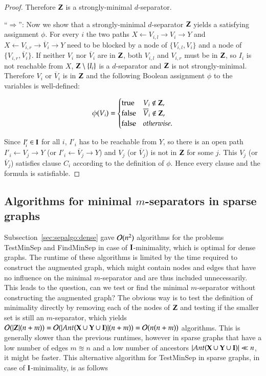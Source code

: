 \begin{proof}
Therefore $ {\bf Z} $ is a strongly-minimal $ d $-separator.

“$\Rightarrow$”: Now we show that a strongly-minimal $ d $-separator $ {\bf Z} $ yields a satisfying assignment $ \phi $. For every $i$ the two paths $X \gets V_{i,l} \to V_i \to Y $ and $X \gets V_{i,r} \to \overline{V}_i \to Y $ need to be blocked by a node of $ \{V_{i,l}, V_i\} $ and a node of $ \{V_{i,r}, \overline{V}_i\} $. If neither $V_i$ nor $ \overline{V}_i $ are in $ {\bf Z} $, 
both $V_{i,l}$ and $V_{i,r}$ must be in ${\bf Z}$, so $I_i$ is not reachable from $X$, ${\bf Z} \setminus \{I_i\}$ is a $d$-separator and ${\bf Z}$ is not strongly-minimal. Therefore $V_i$ or $\overline{V}_i$ is in ${\bf Z}$ and the following Boolean assignment $\phi$ to the variables is well-defined:

\[\phi(V_i) = \begin{cases}
\text{true}&  V_i \notin {\bf Z}, \\
\text{false}& \overline{V}_i \notin {\bf Z},\\
\text{false}& otherwise.
\end{cases}\]

Since $I'_i \in {\bf I}$ for all $ i $, $I'_i$ has to be reachable from $Y$, so there is an open path $I'_i \gets V_j \to Y$ (or $I'_i \gets \overline{V}_j \to Y$) and $ V_j $ (or $ \overline{V}_j $) is not in $ {\bf Z} $ for some $ j $. This $ V_j $ (or $ \overline{V}_j $) satisfies clause $ C_i $ according to the definition of $ \phi $. Hence every clause and the formula is satisfiable.
%


\end{proof}




\subsection{Algorithms for minimal $m$-separators in sparse graphs}
\label{sec:separators:sparse:AGs}

Subsection~\ref{sec:sepalgo:dense} gave ${\cal O}(n^2)$ algorithms for the problems {\sc TestMinSep} 
and {\sc FindMinSep} in case of ${\bf I}$-minimality, which is optimal for dense graphs. 
The runtime of these algorithms is limited by the time required %
to construct the augmented graph, which might contain nodes and edges that have no influence on the minimal $ m $-separator and are thus included unnecessarily. This leads to the question, can we test or find the minimal $ m $-separator without constructing the augmented graph? The obvious way is to test the definition of minimality directly by removing each of the nodes of $ {\bf Z} $ and testing if the smaller set is still an $ m $-separator, which yields ${\cal O}(|{\bf Z}|(n+m)) = {\cal O}(| \textit{Ant}({\bf X} \cup {\bf Y} \cup {\bf I} ) | (n + m)) = {\cal O}(n(n+m))$ algorithms. This is generally slower than the previous runtimes, however in sparse graphs that have a low number of edges $ m \approxeq n $ and a low number of ancestors $ | \textit{Ant}({\bf X} \cup {\bf Y} \cup {\bf I} ) | \ll n $, it might be faster.  
%
This alternative algorithm for {\sc TestMinSep} in sparse graphs, in case of 
${\bf I}$-minimality, is as follows

